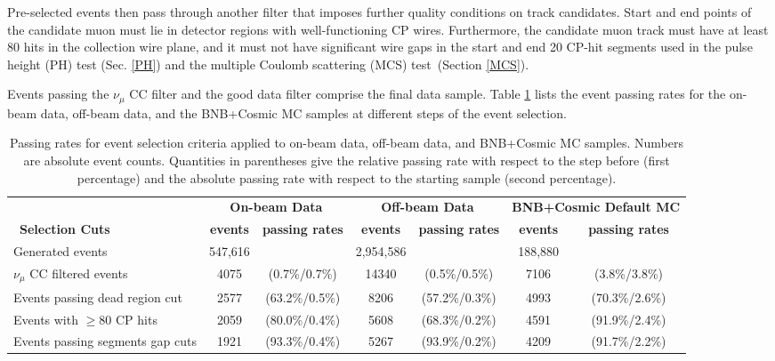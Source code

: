 \documentclass{article}
\begin{document}
Pre-selected events then pass through another filter that imposes further
quality conditions on track candidates. Start and end points of the
candidate muon must lie in detector regions with well-functioning CP wires. Furthermore, the candidate
muon track must have at least 80 hits in the collection wire plane, and it
must not have significant wire gaps in the start and end 20 CP-hit segments
used in the pulse height (PH) test (Sec. \ref{PH}) and the multiple Coulomb
scattering (MCS) test\emph{\ }(Section \ref{MCS}).

Events passing the \emph{$\nu _{\mu }$ }CC filter and the good data filter
comprise the final data sample. Table \ref{tab:passingrates} lists the event
passing rates for the on-beam data, off-beam data, and the BNB+Cosmic MC
samples at different steps of the event selection. 
\begin{table}[tbp]
\caption{Passing rates for event selection criteria applied to on-beam data,
off-beam data, and BNB+Cosmic MC samples. Numbers are absolute event counts.
Quantities in parentheses give the relative passing rate with respect to the
step before (first percentage) and the absolute passing rate with respect to
the starting sample (second percentage).}
\label{tab:passingrates}\centering
\begin{adjustwidth}{-0.8cm}{}
\renewcommand{\tabcolsep}{1pt}
\begin{tabular}
[c]{l|c|c|c|c|c|c}

& \multicolumn{2}{|c}{\textbf{On-beam Data}} & \multicolumn{2}{|c}{\textbf{Off-beam Data}}& \multicolumn{2}{|c}{\textbf{BNB+Cosmic Default MC}}\\\
\textbf{Selection Cuts}& \textbf{events} &\textbf{passing rates} &\textbf{events} & \textbf{passing rates} & \textbf{events} & \textbf{passing rates} \\\hline
Generated events & 547,616 & & 2,954,586 &  & 188,880 & \\
$\nu_{\mu}$ CC filtered events & 4075 & (0.7\%/0.7\%)& 14340 & (0.5\%/0.5\%)& 7106 & (3.8\%/3.8\%)\\
Events passing dead region cut & 2577 & (63.2\%/0.5\%)& 8206 & (57.2\%/0.3\%)& 4993 & (70.3\%/2.6\%) \\
Events with $\geq 80$ CP hits & 2059 & (80.0\%/0.4\%)& 5608 & (68.3\%/0.2\%)& 4591 & (91.9\%/2.4\%) \\ 
Events passing segments gap cuts & 1921 & (93.3\%/0.4\%)& 5267 & (93.9\%/0.2\%)& 4209 & (91.7\%/2.2\%)\\
\end{tabular}
 \end{adjustwidth}
\end{table}
\end{document}
